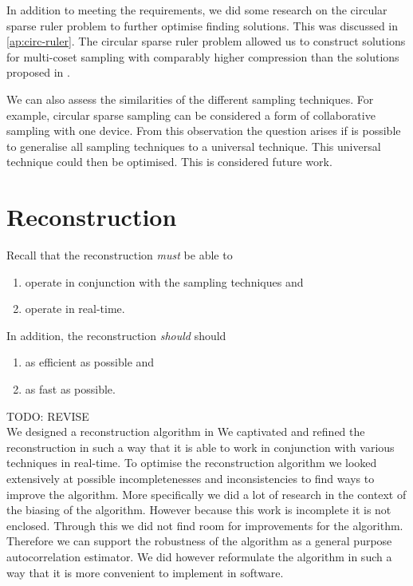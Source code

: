 \documentclass[a4paper, openany, oneside]{memoir}
\begin{document}
In addition to meeting the requirements, we did some research on the circular sparse ruler problem to further optimise finding solutions. This was discussed in \cref{ap:circ-ruler}. The circular sparse ruler problem allowed us to construct solutions for multi-coset sampling with comparably higher compression than the solutions proposed in \cite{ariananda2012compressive}.


We can also assess the similarities of the different sampling techniques. For example, circular sparse sampling can be considered a form of collaborative sampling with one device. From this observation the question arises if is possible to generalise all sampling techniques to a universal technique. This universal technique could then be optimised. This is considered future work.  


\section{Reconstruction}
Recall that the reconstruction \textit{must} be able to
\begin{enumerate}
    \item operate in conjunction with the sampling techniques and
    \item operate in real-time.
\end{enumerate}
In addition, the reconstruction \textit{should} should
\begin{enumerate}
    \item as efficient as possible and
    \item as fast as possible.
\end{enumerate}

TODO: REVISE \\
We designed a reconstruction algorithm in
We captivated and refined the reconstruction in such a way that it is able to work in conjunction with various techniques in real-time. To optimise the reconstruction algorithm we looked extensively at possible incompletenesses and inconsistencies to find ways to improve the algorithm. More specifically we did a lot of research in the context of the biasing of the algorithm. However because this work is incomplete it is not enclosed.  Through this we did not find room for improvements for the algorithm. Therefore we can support the robustness of the algorithm as a general purpose autocorrelation estimator. We did however reformulate the algorithm in such a way that it is more convenient to implement in software.
\end{document}
